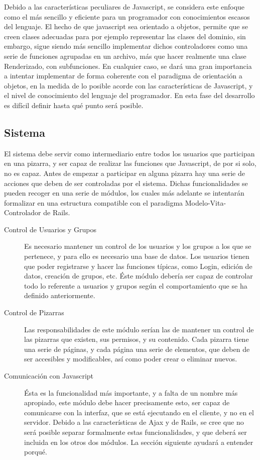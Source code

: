 Debido a las características peculiares de Javascript, se considera este enfoque como el más sencillo y eficiente para un programador con conocimientos escasos del lenguaje. El hecho de que javascript sea orientado a objetos, permite que se creen clases adecuadas para por ejemplo representar las clases del dominio, sin embargo, sigue siendo más sencillo implementar dichos controladores como una serie de funciones agrupadas en un archivo, más que hacer realmente una clase Renderizado, con subfunciones. En cualquier caso, se dará una gran importancia a intentar implementar de forma coherente con el paradigma de orientación a objetos, en la medida de lo posible acorde con las características de Javascript, y el nivel de conocimiento del lenguaje del programador. En esta fase del desarrollo es difícil definir hasta qué punto será posible.


\subsection{Sistema}

El sistema debe servir como intermediario entre todos los usuarios que participan en una pizarra, y ser capaz de realizar las funciones que Javascript, de por si solo, no es capaz. Antes de empezar a participar en alguna pizarra hay una serie de acciones que deben de ser controladas por el sistema. Dichas funcionalidades se pueden recoger en una serie de módulos, los cuales más adelante se intentarán formalizar en una estructura compatible con el paradigma Modelo-Vita-Controlador de Rails.

\begin{description}
	\item[Control de Usuarios y Grupos] Es necesario mantener un control de los usuarios y los grupos a los que se pertenece, y para ello es necesario una base de datos. Los usuarios tienen que poder registrarse y hacer las funciones típicas, como Login, edición de datos, creación de grupos, etc. Éste módulo debería ser capaz de controlar todo lo referente a usuarios y grupos según el comportamiento que se ha definido anteriormente.
	\item[Control de Pizarras] Las responsabilidades de este módulo serían las de mantener un control de las pizarras que existen, sus permisos, y su contenido. Cada pizarra tiene una serie de páginas, y cada página una serie de elementos, que deben de ser accesibles y modificables, así como poder crear o eliminar nuevos.
	\item[Comunicación con Javascript] Ésta es la funcionalidad más importante, y a falta de un nombre más apropiado, este módulo debe hacer precisamente esto, ser capaz de comunicarse con la interfaz, que se está ejecutando en el cliente, y no en el servidor. Debido a las características de Ajax y de Rails, se cree que no será posible separar formalmente estas funcionalidades, y que deberá ser incluida en los otros dos módulos. La sección siguiente ayudará a entender porqué.
\end{description}

